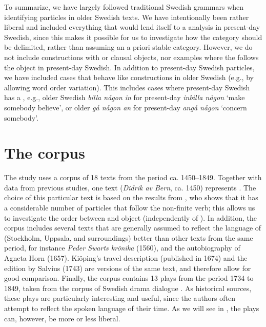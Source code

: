 \documentclass[output=paper]{langscibook}
\begin{document}
To summarize, we have largely followed traditional Swedish grammars when identifying particles in older Swedish texts. We have intentionally been rather liberal and included everything that would lend itself to a  analysis in present-day Swedish, since this makes it possible for us to investigate how the  category should be delimited, rather than assuming an a priori stable category. However, we do not include constructions with  or clausal objects, nor examples where the  follows the object in present-day Swedish. In addition to present-day Swedish particles, we have included cases that behave like  constructions in older Swedish (e.g., by allowing word order variation). This includes cases where present-day Swedish has a , e.g., older Swedish \textit{billa någon in} for present-day \textit{inbilla någon} ‘make somebody believe’, or older \textit{gå någon an} for present-day \textit{angå någon} ‘concern somebody’.


\section{The corpus}\label{sec:lalu:3}


The study uses a corpus of 18 texts from the period ca. 1450–1849. Together with data from previous studies, one text (\textit{Didrik av Bern}, ca. 1450) represents . The choice of this particular text is based on the results from \citet{Ljunggren1932}, who shows that it has a considerable number of particles that follow the non-finite verb; this allows us to investigate the order between  and object (independently of ). In addition, the corpus includes several texts that are generally assumed to reflect the language of  (Stockholm, Uppsala, and surroundings) better than other texts from the same period, for instance \textit{Peder Swarts krönika} (1560), and the autobiography of Agneta Horn (1657). Kiöping’s travel description (published in 1674) and the edition by Salvius (1743) are versions of the same text, and therefore allow for good comparison. Finally, the corpus contains 13 plays from the period 1734 to 1849, taken from the corpus of Swedish drama dialogue \citep{MarttalaStromquist2001}. As historical sources, these plays are particularly interesting and useful, since the authors often attempt to reflect the spoken language of their time. As we will see in , the plays can, however, be more or less liberal.
\end{document}
